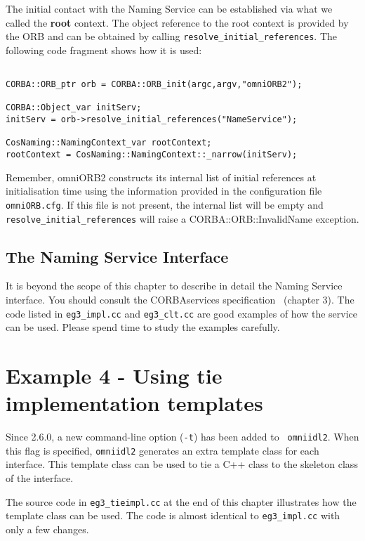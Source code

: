 \documentclass[11pt,twoside,onecolumn]{book}
\begin{document}
The initial contact with the Naming Service can be established via what we
called the {\bf root} context. The object reference to the root context is
provided by the ORB and can be obtained by calling
{\tt resolve\_initial\_references}. The following code fragment shows how
it is used:

{\small
\begin{verbatim}

CORBA::ORB_ptr orb = CORBA::ORB_init(argc,argv,"omniORB2");

CORBA::Object_var initServ;
initServ = orb->resolve_initial_references("NameService");

CosNaming::NamingContext_var rootContext;
rootContext = CosNaming::NamingContext::_narrow(initServ);

\end{verbatim}
}

Remember, omniORB2 constructs its internal list of initial references at
initialisation time using the information provided in the configuration
file {\tt omniORB.cfg}. If this file is not present, the internal list will
be empty and {\tt resolve\_initial\_references} will raise a 
CORBA::ORB::InvalidName exception. 

\subsection{The Naming Service Interface}

It is beyond the scope of this chapter to describe in detail the Naming
Service interface. You should consult the CORBAservices
specification~\cite{corbaservices} (chapter 3). The
code listed in {\tt eg3\_impl.cc} and {\tt eg3\_clt.cc} are good examples
of how the service can be used. Please spend time to study the examples
carefully.

\section{Example 4 - Using tie implementation templates}

Since 2.6.0, a new command-line option ({\tt -t}) has been added to {\tt
omniidl2}. When this flag is specified, {\tt omniidl2} generates an extra
template class for each interface. This template class can be used to
tie a C++ class to the skeleton class of the interface. 

The source code in {\tt eg3\_tieimpl.cc} at the end of this chapter
illustrates how the template class can be used. The code is almost
identical to {\tt eg3\_impl.cc} with only a few changes.
\end{document}
